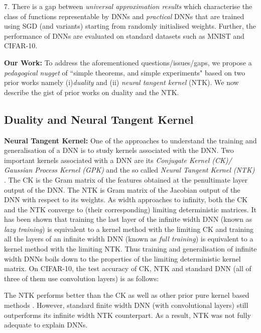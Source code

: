 7. There is a gap between \emph{universal approximation results} which characterise the class of functions representable by DNNs and \emph{practical} DNNs that are trained using SGD (and variants) starting from randomly initialised weights. Further, the performance of DNNs are evaluated on standard datasets such as MNIST and CIFAR-10. 

\textbf{Our Work:} To address the aforementioned questions/issues/gaps, we propose a \emph{pedagogical nugget} of ``simple theorems, and simple experiments" \cite{Aliresponse} based on two prior works namely (i)\emph{duality} and (ii) \emph{neural tangent kernel} (NTK).  We now describe the gist of prior works on duality and the NTK.

\subsection{Duality and Neural Tangent Kernel}

\textbf{Neural Tangent Kernel:} One of the approaches to understand the training and generalisation of a DNN is to study kernels associated with the DNN. Two important kernels associated with a DNN are its \emph{Conjugate Kernel (CK)/ Gaussian Process Kernel (GPK)} and the so called \emph{Neural Tangent Kernel (NTK)} . The CK is the Gram matrix of the features obtained at the penultimate layer output of the DNN. The NTK is Gram matrix of the Jacobian output of the DNN with respect to its weights. As width approaches to infinity, both the CK and the NTK converge to (their corresponding) limiting deterministic matrices. It has been shown that training the last layer of the infinite width DNN (known as \emph{lazy training}) is equivalent to a kernel method with the limiting CK and training all the layers of an infinite width DNN (known as \emph{full training}) is equivalent to a kernel method with the limiting NTK. Thus training and generalisation of infinite width DNNs boils down to the properties of the limiting deterministic kernel matrix. On CIFAR-10, the test accuracy of CK, NTK and standard DNN (all of three of them use convolution layers) is as follows:

The NTK performs better than the CK as well as other prior pure kernel based methods \cite{arora2019exact}. However, standard finite width DNN (with convolutional layers) still outperforms its infinite width NTK counterpart. As a result, NTK was not fully adequate to explain DNNs.


